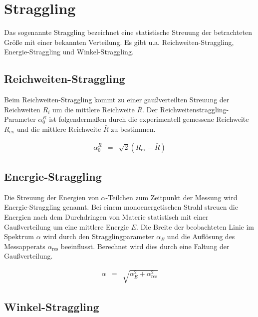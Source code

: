 \documentclass[12pt,a4paper]{scrartcl}
\numberwithin{equation}{section} %
\renewcommand{\[}{} %
\renewcommand{\]}{\noindent} %
\begin{document}
\hypertarget{straggling}{%
\section{Straggling}\label{straggling}}

Das sogenannte Straggling bezeichnet eine statistische Streuung der
betrachteten Größe mit einer bekannten Verteilung. Es gibt u.a.
Reichweiten-Straggling, Energie-Straggling und Winkel-Straggling.

\hypertarget{reichweiten-straggling}{%
\subsection{Reichweiten-Straggling}\label{reichweiten-straggling}}

Beim Reichweiten-Straggling kommt zu einer gaußverteilten Streuung der
Reichweiten \(R_i\) um die mittlere Reichweite \(\bar{R}\). Der
Reichweitenstraggling-Parameter \(\alpha^R_0\) ist folgendermaßen durch
die experimentell gemessene Reichweite \(R_\mathrm{ex}\) und die
mittlere Reichweite \(\bar{R}\) zu bestimmen.

\[
\begin{eqnarray}
        \alpha^R_0 &=& \sqrt{2}\left(R_\mathrm{ex}-\bar{R}\right)
\end{eqnarray}
\]

\hypertarget{energie-straggling}{%
\subsection{Energie-Straggling}\label{energie-straggling}}

Die Streuung der Energien von \(\alpha\)-Teilchen zum Zeitpunkt der
Messung wird Energie-Straggling genannt. Bei einem monoenergetischen
Strahl streuen die Energien nach dem Durchdringen von Materie
statistisch mit einer Gaußverteilung um eine mittlere Energie \(E\). Die
Breite der beobachteten Linie im Spektrum \(\alpha\) wird durch den
Stragglingparameter \(\alpha_E\) und die Auflösung des Messapperats
\(\alpha_\mathrm{res}\) beeinflusst. Berechnet wird dies durch eine
Faltung der Gaußverteilung.

\[
\begin{eqnarray}
        \alpha &=& \sqrt{\alpha_E^2 + \alpha_\mathrm{res}^2}
\end{eqnarray}
\]

\hypertarget{winkel-straggling}{%
\subsection{Winkel-Straggling}\label{winkel-straggling}}
\end{document}
